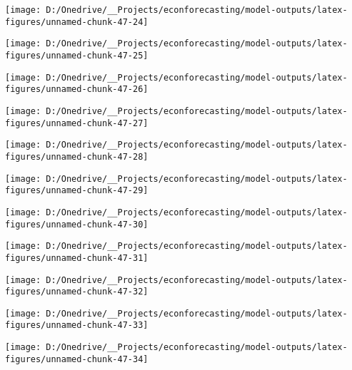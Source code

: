 \documentclass[11pt, letterpaper]{article}\usepackage[]{graphicx}\usepackage[]{color}
\begin{document}
{\centering \texttt{[image: D:/Onedrive/\_\_Projects/econforecasting/model-outputs/latex-figures/unnamed-chunk-47-24]} 

}




{\centering \texttt{[image: D:/Onedrive/\_\_Projects/econforecasting/model-outputs/latex-figures/unnamed-chunk-47-25]} 

}




{\centering \texttt{[image: D:/Onedrive/\_\_Projects/econforecasting/model-outputs/latex-figures/unnamed-chunk-47-26]} 

}




{\centering \texttt{[image: D:/Onedrive/\_\_Projects/econforecasting/model-outputs/latex-figures/unnamed-chunk-47-27]} 

}




{\centering \texttt{[image: D:/Onedrive/\_\_Projects/econforecasting/model-outputs/latex-figures/unnamed-chunk-47-28]} 

}




{\centering \texttt{[image: D:/Onedrive/\_\_Projects/econforecasting/model-outputs/latex-figures/unnamed-chunk-47-29]} 

}




{\centering \texttt{[image: D:/Onedrive/\_\_Projects/econforecasting/model-outputs/latex-figures/unnamed-chunk-47-30]} 

}




{\centering \texttt{[image: D:/Onedrive/\_\_Projects/econforecasting/model-outputs/latex-figures/unnamed-chunk-47-31]} 

}




{\centering \texttt{[image: D:/Onedrive/\_\_Projects/econforecasting/model-outputs/latex-figures/unnamed-chunk-47-32]} 

}




{\centering \texttt{[image: D:/Onedrive/\_\_Projects/econforecasting/model-outputs/latex-figures/unnamed-chunk-47-33]} 

}




{\centering \texttt{[image: D:/Onedrive/\_\_Projects/econforecasting/model-outputs/latex-figures/unnamed-chunk-47-34]} 

}
\end{document}
